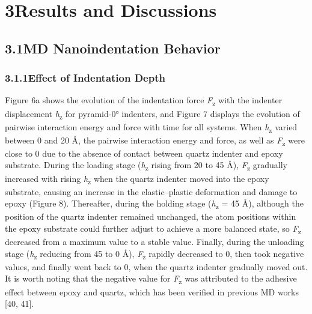 \documentclass{article}
\begin{document}
\section*{3\quad Results and Discussions}

\subsection*{3.1\quad MD Nanoindentation Behavior}

\subsubsection*{3.1.1\quad Effect of Indentation Depth}

Figure 6a shows the evolution of the indentation force \emph{F}\textsubscript{z} with the indenter displacement \emph{h}\textsubscript{z} for pyramid-0° indenters, and Figure 7 displays the evolution of pairwise interaction energy and force with time for all systems. When \emph{h}\textsubscript{z} varied between 0 and 20 Å, the pairwise interaction energy and force, as well as \emph{F}\textsubscript{z} were close to 0 due to the absence of contact between quartz indenter and epoxy substrate. During the loading stage (\emph{h}\textsubscript{z} rising from 20 to 45 Å), \emph{F}\textsubscript{z} gradually increased with rising \emph{h}\textsubscript{z} when the quartz indenter moved into the epoxy substrate, causing an increase in the elastic–plastic deformation and damage to epoxy (Figure 8). Thereafter, during the holding stage (\emph{h}\textsubscript{z} = 45 Å), although the position of the quartz indenter remained unchanged, the atom positions within the epoxy substrate could further adjust to achieve a more balanced state, so \emph{F}\textsubscript{z} decreased from a maximum value to a stable value. Finally, during the unloading stage (\emph{h}\textsubscript{z} reducing from 45 to 0 Å), \emph{F}\textsubscript{z} rapidly decreased to 0, then took negative values, and finally went back to 0, when the quartz indenter gradually moved out. It is worth noting that the negative value for \emph{F}\textsubscript{z} was attributed to the adhesive effect between epoxy and quartz, which has been verified in previous MD works [40, 41].
\end{document}
